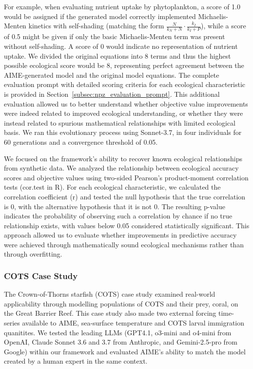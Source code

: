 For example, when evaluating nutrient uptake by phytoplankton, a score of 1.0 would be assigned if the generated model correctly implemented Michaelis-Menten kinetics with self-shading (matching the form $\frac{N}{k_N + N} \cdot \frac{k_I}{k_I + P}$), while a score of 0.5 might be given if only the basic Michaelis-Menten term was present without self-shading. A score of 0 would indicate no representation of nutrient uptake. We divided the original equations into 8 terms and thus the highest possible ecological score would be 8, representing perfect agreement between the AIME-generated model and the original model equations. The complete evaluation prompt with detailed scoring criteria for each ecological characteristic is provided in Section~\ref{subsec:npz_evaluation_prompt}. This additional evaluation allowed us to better understand whether objective value improvements were indeed related to improved ecological understanding, or whether they were instead related to spurious mathematical relationships with limited ecological basis. We ran this evolutionary process using Sonnet-3.7, in four individuals for 60 generations and a convergence threshold of 0.05.

We focused on the framework's ability to recover known ecological relationships from synthetic data. We analyzed the relationship between ecological accuracy scores and objective values using two-sided Pearson's product-moment correlation tests (cor.test in R). For each ecological characteristic, we calculated the correlation coefficient (r) and tested the null hypothesis that the true correlation is 0, with the alternative hypothesis that it is not 0. The resulting p-value indicates the probability of observing such a correlation by chance if no true relationship exists, with values below 0.05 considered statistically significant. This approach allowed us to evaluate whether improvements in predictive accuracy were achieved through mathematically sound ecological mechanisms rather than through overfitting.

\subsubsection{COTS Case Study}

The Crown-of-Thorns starfish (COTS) case study examined real-world applicability through modelling populations of COTS and their prey, coral, on the Great Barrier Reef. This case study also made two external forcing time-series available to AIME, sea-surface temperature and COTS larval immigration quanitites. We tested the leading LLMs (GPT4.1, o3-mini and o4-mini from OpenAI, Claude Sonnet 3.6 and 3.7 from Anthropic, and Gemini-2.5-pro from Google) within our framework and evaluated AIME's ability to match the model created by a human expert in the same context.

